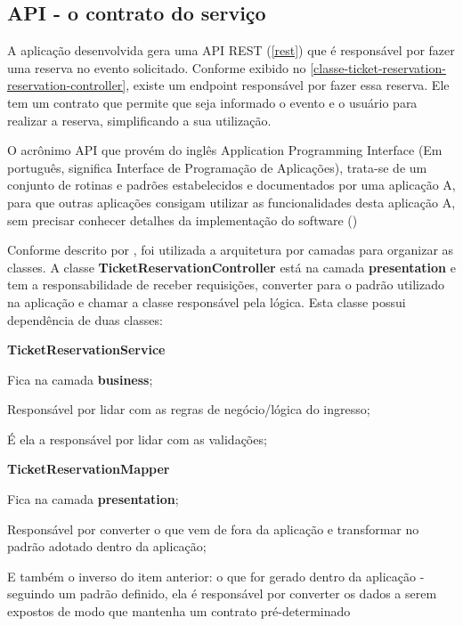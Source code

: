 \subsection{API - o contrato do serviço}\label{api}

A aplicação desenvolvida gera uma API REST (\autoref{rest}) que é responsável por fazer uma reserva
no evento solicitado.
Conforme exibido no \autoref{classe-ticket-reservation-reservation-controller}, existe um endpoint responsável
por fazer essa reserva. Ele tem um contrato que permite que seja informado o evento e
o usuário para realizar a reserva, simplificando a sua utilização.

\begin{citacao}
O acrônimo API que provém do inglês Application Programming Interface (Em português, significa
Interface de Programação de Aplicações), trata-se de um conjunto de rotinas e padrões estabelecidos
e documentados por uma aplicação A, para que outras aplicações consigam utilizar as funcionalidades
desta aplicação A, sem precisar conhecer detalhes da implementação do software
(\cite{o-que-e-api-rest-e-restful})
\end{citacao}

Conforme descrito por \cite{mark-richards-software-architecture-patterns},
foi utilizada a arquitetura por camadas para organizar as classes.
A classe \textbf{TicketReservationController} está na camada \textbf{presentation} e tem a
responsabilidade de receber requisições, converter para o padrão utilizado na
aplicação e chamar a classe responsável pela lógica.
Esta classe possui dependência de duas classes:

\begin{alineas}

  \item \textbf{TicketReservationService}

  \begin{alineas}
     \item Fica na camada \textbf{business};
     \item Responsável por lidar com as regras de negócio/lógica do ingresso;
     \item É ela a responsável por lidar com as validações;
  \end{alineas}

  \item \textbf{TicketReservationMapper}

  \begin{alineas}
     \item Fica na camada \textbf{presentation};
     \item Responsável por converter o que vem de fora da aplicação e transformar
           no padrão adotado dentro da aplicação;
     \item E também o inverso do item anterior: o que for gerado dentro da aplicação -
           seguindo um padrão definido, ela é responsável por converter
           os dados a serem expostos de modo que mantenha um contrato pré-determinado
  \end{alineas}

\end{alineas}

